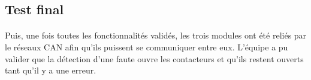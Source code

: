 	\subsection{Test final}
	
		\paragraph{}
		Puis, une fois toutes les fonctionnalités validés, les trois modules ont été reliés par le réseaux CAN afin qu’ils puissent se communiquer entre eux. L’équipe a pu valider que la détection d’une faute ouvre les contacteurs et qu’ils restent ouverts tant qu’il y a une erreur.
		